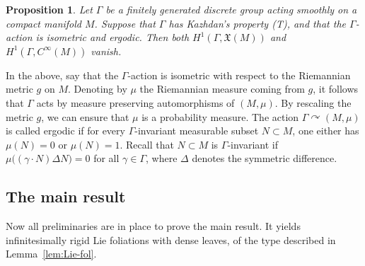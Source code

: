 \documentclass[11pt, letterpaper, oneside,reqno]{amsart}
\theoremstyle{plain}
\newtheorem{prop}[thm]{Proposition}
\theoremstyle{underline}
\theoremstyle{definition}
\theoremstyle{remark}
\begin{document}
	\begin{prop}\label{prop:zimmer}
		Let $\Gamma$ be a finitely generated discrete group acting smoothly on a compact manifold $M$. Suppose that $\Gamma$ has Kazhdan's property (T), and that the $\Gamma$-action is isometric and ergodic. Then both $H^{1}(\Gamma,\mathfrak{X}(M))$ and $H^{1}(\Gamma,C^{\infty}(M))$ vanish.
	\end{prop}
	
	In the above, say that the $\Gamma$-action is isometric with respect to the Riemannian metric $g$ on $M$. Denoting by $\mu$ the Riemannian measure coming from $g$, it follows that $\Gamma$ acts by measure preserving automorphisms of $(M,\mu)$. By rescaling the metric $g$, we can ensure that $\mu$ is a probability measure. The action $\Gamma\curvearrowright(M,\mu)$ is called ergodic if for every $\Gamma$-invariant measurable subset $N\subset M$, one either has $\mu(N)=0$ or $\mu(N)=1$. Recall that $N\subset M$ is $\Gamma$-invariant if $\mu\big((\gamma\cdot N)\Delta N\big)=0$ for all $\gamma\in\Gamma$, where $\Delta$ denotes the symmetric difference. 
	
	\subsection{The main result}
	Now all preliminaries are in place to prove the main result. It yields infinitesimally rigid Lie foliations with dense leaves, of the type described in Lemma~\ref{lem:Lie-fol}.
	
\end{document}
